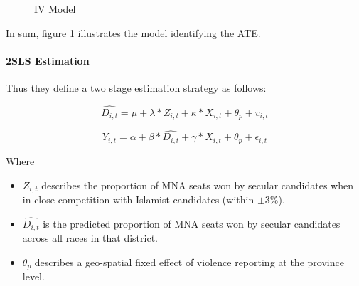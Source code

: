 \documentclass{scrartcl}
\begin{document}
\begin{figure}[h]
  \centering
  \caption{IV Model}
  \label{fig:ate_iv}
\end{figure}

In sum, figure \ref{fig:ate_iv} illustrates the model identifying the ATE.

\paragraph{2SLS Estimation}

Thus they define a two stage estimation strategy as follows:


\begin{equation} \label{eq:2}
  \widehat{D_{i,t}} = \mu + \lambda * Z_{i,t} + \kappa*X_{i,t} + \theta_p + v_{i,t}
\end{equation}

 \begin{equation} \label{eq:3}
  Y_{i,t} = \alpha + \beta * \widehat{D_{i,t}} + \gamma*X_{i,t} + \theta_{p} + \epsilon_{i,t}
\end{equation}

Where

\begin{itemize}
\item $Z_{i,t}$ describes the proportion of MNA seats won by secular candidates when in close competition with Islamist candidates (within $\pm 3\%$).
\item $\widehat{D_{i,t}}$ is the predicted proportion of MNA seats won by secular candidates across all races in that district.
\item $\theta_p$ describes a geo-spatial fixed effect of violence reporting at the province level. 
\end{itemize}
\end{document}
